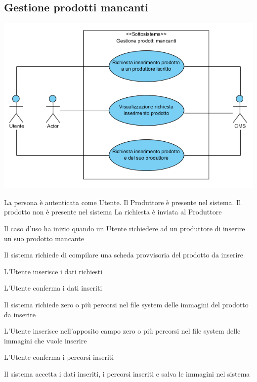 \subsection{Gestione prodotti mancanti}
\begin{center}
   \includegraphics[width=\textwidth]{assets/visualParadigm/GestioneProdottiMancanti}
\end{center}
{}
{La persona è autenticata come Utente. Il Produttore è presente nel sistema. Il prodotto non è presente nel sistema}
{La richiesta è inviata al Produttore}
{\begin{enumCU}
		\item Il caso d'uso ha inizio quando un Utente richiedere ad un produttore di inserire un suo prodotto mancante
		\item Il sistema richiede di compilare una scheda provvisoria del prodotto da inserire
		\item L'Utente inserisce i dati richiesti \label{curicinsimmpro:1}
		\item L'Utente conferma i dati inseriti 
		\item Il sistema richiede zero o più percorsi nel file system delle immagini del prodotto da inserire
		\item L'Utente inserisce nell'apposito campo zero o più percorsi nel file system delle immagini che vuole inserire \label{curicinsimmpro:2}
		\item L'Utente conferma i percorsi inseriti \label{curicinsimmpro:3}
		\item Il sistema accetta i dati inseriti, i percorsi inseriti e salva le immagini nel sistema
	\end{enumCU}}
